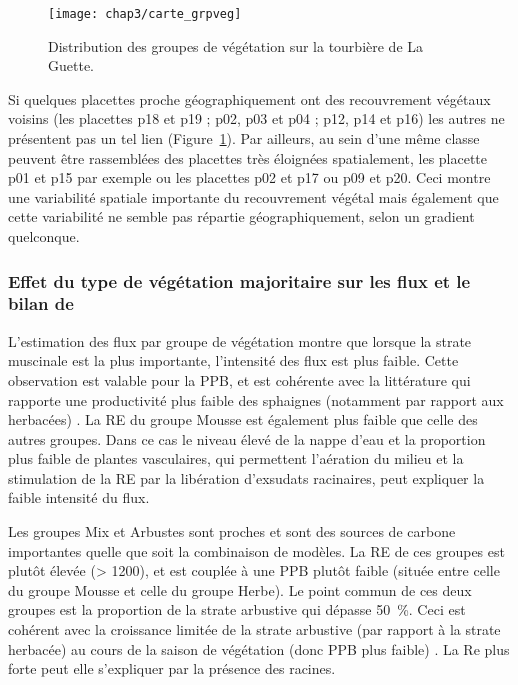 \begin{figure}
\centering
\texttt{[image: chap3/carte\_grpveg]}
\caption{Distribution des groupes de végétation sur la tourbière de La Guette.}
\label{fig:carte_grpveg}
\end{figure}

Si quelques placettes proche géographiquement ont des recouvrement végétaux voisins (les placettes p18 et p19 ; p02, p03 et p04 ; p12, p14 et p16) les autres ne présentent pas un tel lien (Figure~\ref{fig:carte_grpveg}).
Par ailleurs, au sein d'une même classe peuvent être rassemblées des placettes très éloignées spatialement, les placette p01 et p15 par exemple ou les placettes p02 et p17 ou p09 et p20.
Ceci montre une variabilité spatiale importante du recouvrement végétal mais également que cette variabilité ne semble pas répartie géographiquement, selon un gradient quelconque.

\subsubsection{Effet du type de végétation majoritaire sur les flux et le bilan de \coo}

L'estimation des flux par groupe de végétation montre que lorsque la strate muscinale est la plus importante, l'intensité des flux est plus faible.
Cette observation est valable pour la PPB, et est cohérente avec la littérature qui rapporte une productivité plus faible des sphaignes (notamment par rapport aux herbacées) \citep{rydin2013b,beyer2015}. 
La RE du groupe Mousse est également plus faible que celle des autres groupes.
Dans ce cas le niveau élevé de la nappe d'eau et la proportion plus faible de plantes vasculaires, qui permettent l'aération du milieu et la stimulation de la RE par la libération d'exsudats racinaires, peut expliquer la faible intensité du flux.

Les groupes Mix et Arbustes sont proches et sont des sources de carbone importantes quelle que soit la combinaison de modèles.
La RE de ces groupes est plutôt élevée (> \SI{1200}{\gcma}), et est couplée à une PPB plutôt faible (située entre celle du groupe Mousse et celle du groupe Herbe).
Le point commun de ces deux groupes est la proportion de la strate arbustive qui dépasse \SI{50}{\percent}.
Ceci est cohérent avec la croissance limitée de la strate arbustive (par rapport à la strate herbacée) au cours de la saison de végétation (donc PPB plus faible) \citep{rydin2013b}.
La Re plus forte peut elle s'expliquer par la présence des racines.

